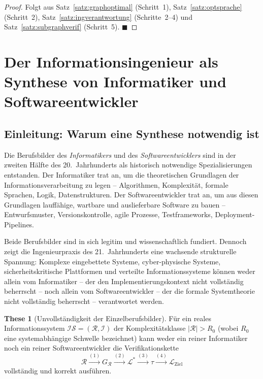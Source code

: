﻿\documentclass[a4paper,12pt]{article}
\theoremstyle{definition}
\newtheorem{these}{These}
\begin{document}
\begin{proof}
Folgt aus Satz~\ref{satz:graphoptimal} (Schritt~1),
Satz~\ref{satz:optsprache} (Schritt~2),
Satz~\ref{satz:ingverantwortung} (Schritte~2--4) und
Satz~\ref{satz:subgraphverif} (Schritt~5). $\blacksquare$
\end{proof}

\section{Der Informationsingenieur als Synthese von Informatiker und Softwareentwickler}
\label{sec:synthese}

\subsection{Einleitung: Warum eine Synthese notwendig ist}

Die Berufsbilder des \emph{Informatikers} und des \emph{Softwareentwicklers} sind in der
zweiten Hälfte des 20.~Jahrhunderts als historisch notwendige Spezialisierungen entstanden.
Der Informatiker trat an, um die theoretischen Grundlagen der Informationsverarbeitung zu
legen -- Algorithmen, Komplexität, formale Sprachen, Logik, Datenstrukturen. Der
Softwareentwickler trat an, um aus diesen Grundlagen lauffähige, wartbare und auslieferbare
Software zu bauen -- Entwurfsmuster, Versionskontrolle, agile Prozesse, Testframeworks,
Deployment-Pipelines.

Beide Berufsbilder sind in sich legitim und wissenschaftlich fundiert. Dennoch zeigt die
Ingenieurpraxis des 21.~Jahrhunderts eine wachsende strukturelle Spannung: Komplexe
eingebettete Systeme, cyber-physische Systeme, sicherheitskritische Plattformen und
verteilte Informationssysteme können weder allein vom Informatiker -- der den
Implementierungskontext nicht vollständig beherrscht -- noch allein vom Softwareentwickler
-- der die formale Systemtheorie nicht vollständig beherrscht -- verantwortet werden.

\begin{these}[Unvollständigkeit der Einzelberufsbilder]
\label{these:unvollst}
Für ein reales Informationssystem $\mathcal{IS} = (\mathcal{R}, \mathcal{I})$ der
Komplexitätsklasse $|\mathcal{R}| > R_0$ (wobei $R_0$ eine systemabhängige Schwelle
bezeichnet) kann weder ein reiner Informatiker noch ein reiner Softwareentwickler
die Verifikationskette
\[
  \mathcal{R}
  \xrightarrow{(1)} G_\mathcal{R}
  \xrightarrow{(2)} \mathcal{L}^*
  \xrightarrow{(3)} \tau
  \xrightarrow{(4)} \mathcal{L}_{\text{Ziel}}
\]
vollständig und korrekt ausführen.
\end{these}
\end{document}
